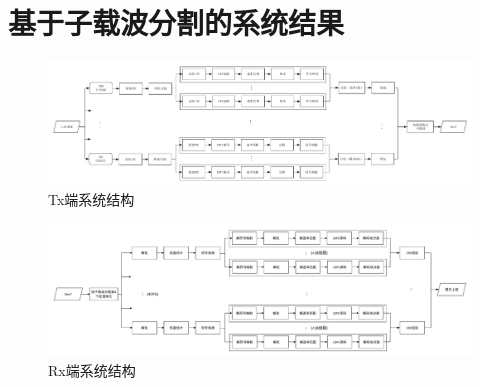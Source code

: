 \documentclass{article}
\begin{document}
\section{基于子载波分割的系统结果}
\begin{figure}[H]
	\centering
	\includegraphics[width = \textwidth]{txstru.pdf}
	\caption{Tx端系统结构}
\end{figure}
\begin{figure}[H]
	\centering
	\includegraphics[width = \textwidth]{rxstru.pdf}
	\caption{Rx端系统结构}
\end{figure}

\end{document}
